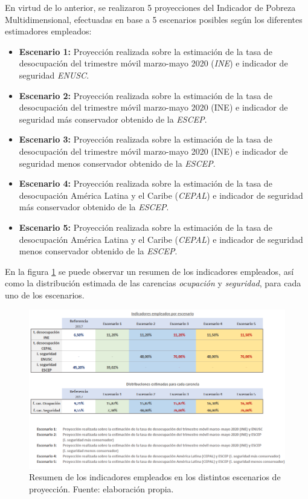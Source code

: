 \documentclass[12pt,letterpaper,spanish]{article}
\begin{document}
En virtud de lo anterior, se realizaron 5 proyecciones del Indicador de Pobreza Multidimensional, efectuadas en base a 5 escenarios posibles según los diferentes estimadores empleados:

\begin{itemize}
\item \textbf{Escenario 1:} Proyección realizada sobre la estimación de la tasa de desocupación del trimestre móvil marzo-mayo 2020 (\textit{INE}) e indicador de seguridad \textit{ENUSC}.

\item \textbf{Escenario 2:} Proyección realizada sobre la estimación de la tasa de desocupación del trimestre móvil marzo-mayo 2020 (INE) e indicador de seguridad más conservador obtenido de la \textit{ESCEP}.	

\item \textbf{Escenario 3:} Proyección realizada sobre la estimación de la tasa de desocupación del trimestre móvil marzo-mayo 2020 (INE) e indicador de seguridad menos conservador obtenido de la \textit{ESCEP}.

\item \textbf{Escenario 4:} Proyección realizada sobre la estimación de la tasa de desocupación América Latina y el Caribe (\textit{CEPAL}) e indicador de seguridad más conservador obtenido de la \textit{ESCEP}.	

\item \textbf{Escenario 5:} Proyección realizada sobre la estimación de la tasa de desocupación América Latina y el Caribe (\textit{CEPAL}) e indicador de seguridad menos conservador obtenido de la \textit{ESCEP}.


\end{itemize}

En la figura \ref{resumen_ind_escenarios} se puede observar un resumen de los indicadores empleados, así como la distribución estimada de las carencias \textit{ocupación} y \textit{seguridad}, para cada uno de los escenarios. 


\begin{figure}[H]
    \centering
    \includegraphics[width=\textwidth]{Max/resumen_escenarios.png}
    \caption{Resumen de los indicadores empleados en los distintos escenarios de proyección. Fuente: elaboración propia.}
    \label{resumen_ind_escenarios}
\end{figure}
\end{document}

